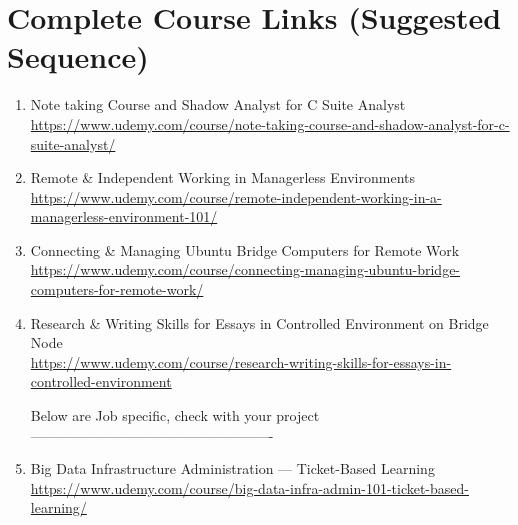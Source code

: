 \documentclass[12pt]{article}
\begin{document}
	\newpage
	
	\section*{Complete Course Links (Suggested Sequence)}
	
	\begin{enumerate}[label=\textbf{Course \arabic*:}]
		
		\item Note taking Course and Shadow Analyst for C Suite Analyst\\
		\href{https://www.udemy.com/course/note-taking-course-and-shadow-analyst-for-c-suite-analyst/}
		{https://www.udemy.com/course/note-taking-course-and-shadow-analyst-for-c-suite-analyst/}
		
		\item Remote \& Independent Working in Managerless Environments \\
		\href{https://www.udemy.com/course/remote-independent-working-in-a-managerless-environment-101/}
		{https://www.udemy.com/course/remote-independent-working-in-a-managerless-environment-101/}
		
		\item Connecting \& Managing Ubuntu Bridge Computers for Remote Work\\
		\href{https://www.udemy.com/course/connecting-managing-ubuntu-bridge-computers-for-remote-work/}
		{https://www.udemy.com/course/connecting-managing-ubuntu-bridge-computers-for-remote-work/}
		
		
				
		\item Research \& Writing Skills for Essays in Controlled Environment on Bridge Node\\
		\href{https://www.udemy.com/course/research-writing-skills-for-essays-in-controlled-environment}
		{https://www.udemy.com/course/research-writing-skills-for-essays-in-controlled-environment}
		
		Below are Job specific,
		check with your project 
		----------------------------------------------------
		
		\item Big Data Infrastructure Administration — Ticket-Based Learning \\
		\href{https://www.udemy.com/course/big-data-infra-admin-101-ticket-based-learning/}
		{https://www.udemy.com/course/big-data-infra-admin-101-ticket-based-learning/}
		

\end{enumerate}
\end{document}
